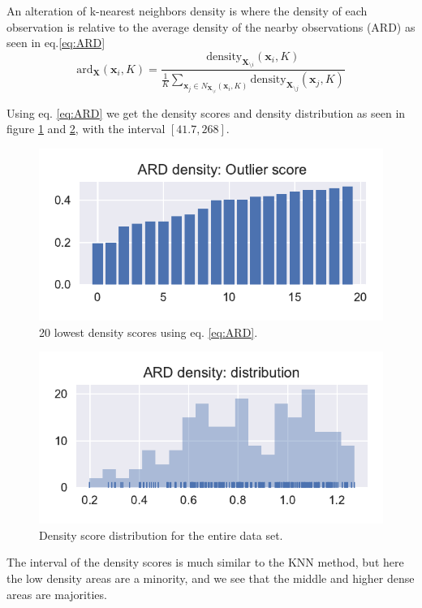 An alteration of k-nearest neighbors density is where the density of each observation is relative to the average density of the nearby observations (ARD) as seen in eq.\eqref{eq:ARD}
\begin{equation}\label{eq:ARD}
    \text{ard}_\mathbf{X} (\mathbf{x}_i, K) = \frac{\text{density}_{\mathbf{X}_{\setminus i}} (\mathbf{x}_i, K) }{\frac{1}{K} \sum_{\mathbf{x}_j \in N_{\mathbf{X}_{\setminus i}} (\mathbf{x}_i, K)} \text{density}_{\mathbf{X}_{\setminus j}} (\mathbf{x}_j, K)}
\end{equation}

Using eq. \eqref{eq:ARD} we get the density scores and density distribution as seen in figure \ref{fig:ARD_DensityScore} and \ref{fig:ARD_DensityDistribution}, with the interval $[41.7, 268]$.

\begin{multicols}{2}
\begin{figure}[H]
    \includegraphics[width=\linewidth]{fig/ARD_densitybarplot_lowest20.pdf}
    \caption{20 lowest density scores using eq. \eqref{eq:ARD}.}
    \label{fig:ARD_DensityScore}
\end{figure}

\begin{figure}[H]
    \includegraphics[width=\linewidth]{fig/ARD_densitydistribution.pdf}
    \caption{Density score distribution for the entire data set.}
    \label{fig:ARD_DensityDistribution}
\end{figure}
\end{multicols}

The interval of the density scores is much similar to the KNN method, but here the low density areas are a minority, and we see that the middle and higher dense areas are majorities. 